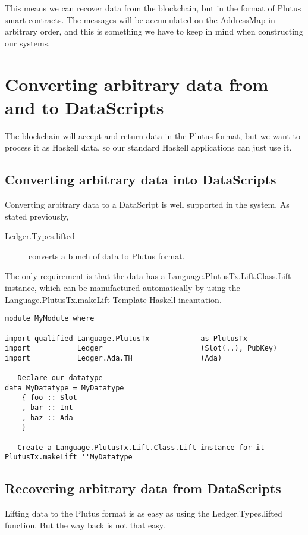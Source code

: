 \documentclass{article}
\begin{document}
This means we can recover data from the blockchain, but in the format of Plutus smart contracts. The messages will be accumulated on the AddressMap in arbitrary order, and this is something we have to keep in mind when constructing our systems.

\section{Converting arbitrary data from and to DataScripts}
The blockchain will accept and return data in the Plutus format, but we want to process it as Haskell data, so our standard Haskell applications can just use it.

\subsection{Converting arbitrary data into DataScripts}
Converting arbitrary data to a DataScript is well supported in the system. As stated previously,

\begin{description}
\item [Ledger.Types.lifted] converts a bunch of data to Plutus format.
\end{description}

The only requirement is that the data has a Language.PlutusTx.Lift.Class.Lift instance, which can be manufactured automatically by using the Language.PlutusTx.makeLift Template Haskell incantation.

\begin{verbatim}
module MyModule where

import qualified Language.PlutusTx            as PlutusTx
import           Ledger                       (Slot(..), PubKey)
import           Ledger.Ada.TH                (Ada)

-- Declare our datatype
data MyDatatype = MyDatatype
    { foo :: Slot
    , bar :: Int
    , baz :: Ada
    }

-- Create a Language.PlutusTx.Lift.Class.Lift instance for it
PlutusTx.makeLift ''MyDatatype
\end{verbatim}

\subsection{Recovering arbitrary data from DataScripts}
Lifting data to the Plutus format is as easy as using the Ledger.Types.lifted function. But the way back is not that easy.
\end{document}
